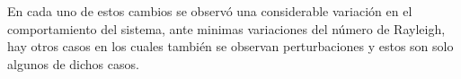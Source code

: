 En cada uno de estos cambios se observó una considerable variación en el comportamiento del sistema, ante minimas variaciones
del número de Rayleigh, hay otros casos en los cuales también se observan perturbaciones y estos son solo algunos
de dichos casos.


\begin{figure}[H]
    \centering

\end{figure}

